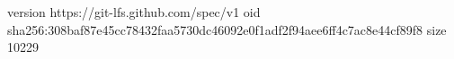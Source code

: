 version https://git-lfs.github.com/spec/v1
oid sha256:308baf87e45cc78432faa5730dc46092e0f1adf2f94aee6ff4c7ac8e44cf89f8
size 10229

